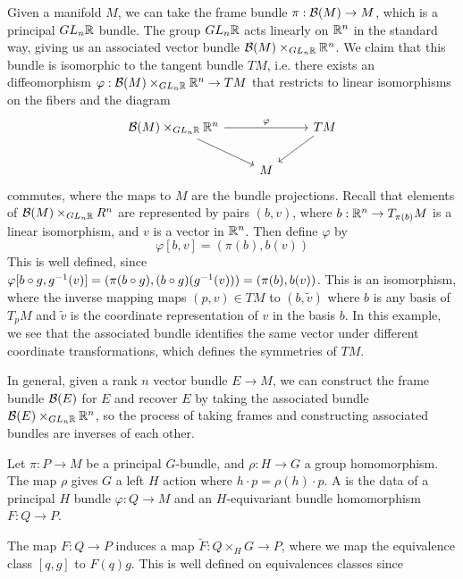 \begin{exmp}
Given a manifold $M$, we can take the frame bundle $\pi : \mathcal{B}(M) \to M$, which is a
principal $GL_n\mathbb{R}$ bundle. The group $GL_n\mathbb{R}$ acts linearly on $\mathbb{R}^n$ in the
standard way, giving us an associated vector bundle $\mathcal{B}(M) \times_{GL_n\mathbb{R}} \mathbb{R}^n$.
We claim that this bundle is isomorphic to the tangent bundle $TM$, i.e. there
exists an diffeomorphism $\varphi : \mathcal{B}(M) \times_{GL_n\mathbb{R}} \mathbb{R}^n \to TM$ that
restricts to linear isomorphisms on the fibers and the diagram
\[\begin{tikzcd}
\B(M) \times_{GL_n\R} \R^n \ar[rr, "\varphi"] \ar[dr] && TM \ar[dl] \\
& M
\end{tikzcd}\]
commutes, where the maps to $M$ are the bundle projections. Recall that
elements of $\mathcal{B}(M) \times_{GL_n\mathbb{R}} R^n$ are represented by pairs $(b, v)$,
where $b: \mathbb{R}^n \to T_{\pi(b)}M$ is a linear isomorphism, and $v$ is a vector in $\mathbb{R}^n$.
Then define $\varphi$ by
\[
\varphi[b,v] = (\pi(b), b(v))
\]
This is well defined, since $\varphi[b\circ g, g^{-1}(v)] = (\pi(b \circ g),
(b\circ g)(g^{-1}(v))) = (\pi(b), b(v))$. This is an isomorphism, where the
inverse mapping maps $(p,v) \in TM$ to $(b, \tilde{v})$ where $b$ is any
basis of $T_pM$ and $\tilde{v}$ is the coordinate representation of $v$ in the
basis $b$. In this example, we see that the associated bundle identifies the same vector
under different coordinate transformations, which defines the symmetries of
$TM$.
\end{exmp}
%
In general, given a rank $n$ vector bundle $E \to M$, we can construct the
frame bundle  $\mathcal{B}(E)$ for $E$ and recover $E$ by taking the associated bundle
$\mathcal{B}(E) \times_{GL_n\mathbb{R}} \mathbb{R}^n$, so the process of taking frames and constructing
associated bundles are inverses of each other.
%
\begin{defn}
Let $\pi : P \to M$ be a principal $G$-bundle, and $\rho : H \to G$ a group
homomorphism. The map $\rho$ gives $G$ a left $H$ action where
$h \cdot p = \rho(h) \cdot p$. A  is the
data of a principal $H$ bundle $\varphi : Q \to M$ and an $H$-equivariant bundle
homomorphism $F : Q \to P$.
\end{defn}
%
The map $F : Q \to P$ induces a map $\tilde{F} : Q \times_H G \to P$, where we
map the equivalence class $[q,g]$ to $F(q) g$. This is well defined
on equivalences classes since
